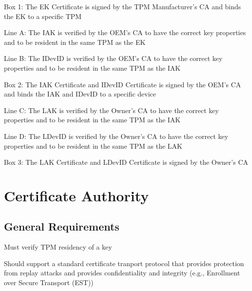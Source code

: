 \documentclass{article}
\begin{document}
Box 1: The EK Certificate is signed by the TPM Manufacturer's CA and binds the EK to a specific TPM

Line A: The IAK is verified by the OEM's CA to have the correct key properties and to be resident in the same TPM as the EK

Line B: The IDevID is verified by the OEM's CA to have the correct key properties and to be resident in the same TPM as the IAK

Box 2: The IAK Certificate and IDevID Certificate is signed by the OEM's CA and binds the IAK and IDevID to a specific device

Line C: The LAK is verified by the Owner's CA to have the correct key properties and to be resident in the same TPM as the IAK

Line D: The LDevID is verified by the Owner's CA to have the correct key properties and to be resident in the same TPM as the LAK

Box 3: The LAK Certificate and LDevID Certificate is signed by the Owner's CA

\section*{Certificate Authority}
\subsection*{General Requirements}
Must verify TPM residency of a key

Should support a standard certificate tranport protocol that provides protection from replay attacks and provides confidentiality and integrity (e.g., Enrollment over Secure Transport (EST))
\end{document}
